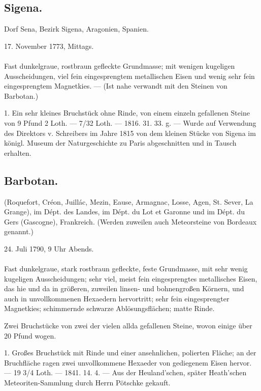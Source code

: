 \documentclass[a4paper, 11pt, oneside, polutonikogreek, german]{article}
\begin{document}
\subsection[]{Sigena.}
\begin{center}
\small
Dorf Sena, Bezirk Sigena, Aragonien, Spanien.

17. November 1773, Mittags.
\end{center}
\paragraph{}
Fast dunkelgraue, rostbraun gefleckte Grundmasse; mit wenigen kugeligen Ausscheidungen, viel fein eingesprengtem metallischen Eisen und wenig sehr fein eingesprengtem Magnetkies. — (Ist nahe verwandt mit den Steinen von Barbotan.)

1. Ein sehr kleines Bruchstück ohne Rinde, von einem einzeln gefallenen Steine von 9 Pfund 2 Loth. — 7/32 Loth. — 1816. 31. 33. g. — Wurde auf Verwendung des Direktors v. Schreibers im Jahre 1815 von dem kleinen Stücke von Sigena im königl. Museum der Naturgeschichte zu Paris abgeschnitten und in Tausch erhalten.
\subsection{Barbotan.}
\begin{center}
\small
(Roquefort, Créon, Juillác, Mezin, Eause, Armagnac, Losse, Agen, St. Sever, La Grange), im Dépt. des Landes, im Dépt. du Lot et Garonne und im Dépt. du Gers (Gascogne), Frankreich. (Werden zuweilen auch Meteorsteine von Bordeaux genannt.)

24. Juli 1790, 9 Uhr Abends.
\end{center}
\paragraph{}
Fast dunkelgraue, stark rostbraun gefleckte, feste Grundmasse, mit sehr wenig kugeligen Ausscheidungen; sehr viel, meist fein eingesprengtes metallisches Eisen, das hie und da in größeren, zuweilen linsen- und bohnengroßen Körnern, und auch in unvollkommenen Hexaedern hervortritt; sehr fein eingesprengter Magnetkies; schimmernde schwarze Ablösungsflächen; matte Rinde.

Zwei Bruchstücke von zwei der vielen allda gefallenen Steine, wovon einige über 20 Pfund wogen.

1. Großes Bruchstück mit Rinde und einer ansehnlichen, polierten Fläche; an der Bruchfläche ragen zwei unvollkommene Hexaeder von gediegenem Eisen hervor. — 19 3/4 Loth. — 1841. 14. 4. — Aus der Heuland'schen, später Heath'schen Meteoriten-Sammlung durch Herrn Pötschke gekauft.
\end{document}
